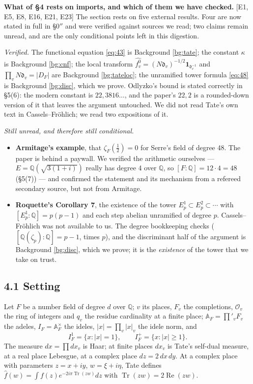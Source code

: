 \documentclass[11pt,reqno]{amsart}
\theoremstyle{plain}
\theoremstyle{definition}
\theoremstyle{remark}
\newcommand{\Q}{\mathbb{Q}}
\newcommand{\fh}{\widehat{f}}
\DeclareMathOperator{\Tr}{Tr}
\newcommand{\Ledger}[1]{{\scriptsize\textsf{[#1]}}}
\begin{document}
\begin{caution}
\textbf{What of \S4 rests on imports, and which of them we have checked.}
\Ledger{E1, E5, E8, E16, E21, E23} The section rests on five external results. Four are
now stated in full in \S0$''$ and were verified against sources we read; two claims
remain unread, and are the only conditional points left in this digestion.

\emph{Verified.} The functional equation \eqref{eq:43} is Background \ref{bg:tate};
the constant $\kappa$ is Background \ref{bg:cnf}; the local transform
$\widehat{f_v^0}=(N\mathfrak d_v)^{-1/2}\mathbf 1_{\mathfrak d_v^{-1}}$ and
$\prod_vN\mathfrak d_v=|D_F|$ are Background \ref{bg:tateloc}; the unramified tower
formula \eqref{eq:48} is Background \ref{bg:disc}, which we prove. Odlyzko's bound is
stated correctly in \S5(6): the modern constant is $22{,}3816\ldots$, and the paper's
$22{,}2$ is a rounded-down version of it that leaves the argument untouched. We did
not read Tate's own text in Cassels--Fr\"ohlich; we read two expositions of it.

\emph{Still unread, and therefore still conditional.}
\begin{itemize}[leftmargin=1.4em,itemsep=2pt]
\item \textbf{Armitage's example}, that $\zeta_F(\tfrac12)=0$ for Serre's field of
  degree 48. The paper is behind a paywall. We verified the arithmetic ourselves ---
  $E=\Q(\sqrt{3(1+i)})$ really has degree 4 over $\Q$, so $[F:\Q]=12\cdot4=48$
  (\S5(7)) --- and confirmed the statement and its mechanism from a refereed secondary
  source, but not from Armitage.
\item \textbf{Roquette's Corollary 7}, the existence of the tower $E_p^1\subset
  E_p^2\subset\cdots$ with $[E_p^1:\Q]=p(p-1)$ and each step abelian unramified of
  degree $p$. Cassels--Fr\"ohlich was not available to us. The degree bookkeeping
  checks ($[\Q(\zeta_p):\Q]=p-1$, times $p$), and the discriminant half of the argument
  is Background \ref{bg:disc}, which we prove; it is the \emph{existence} of the tower
  that we take on trust.
\end{itemize}
\end{caution}

\subsection*{4.1 Setting}

Let $F$ be a number field of degree $d$ over $\Q$; $v$ its places, $F_v$ the
completions, $\mathcal O_v$ the ring of integers and $q_v$ the residue cardinality at
a finite place; $\mathbb A_F=\prod'_vF_v$ the adeles, $I_F=\mathbb A_F^\times$ the
ideles, $|x|=\prod_v|x|_v$ the idele norm, and
\[I_F^1=\{x:|x|=1\},\qquad I_F^+=\{x:|x|\ge1\} .\]
The measure $dx=\prod dx_v$ is Haar; at finite places $dx_v$ is Tate's self-dual
measure, at a real place Lebesgue, at a complex place $dz=2\,dx\,dy$. At a complex
place with parameters $z=x+iy$, $w=\xi+i\eta$, Tate defines
$\fh(w)=\int f(z)e^{-2i\pi\Tr(zw)}dz$ with $\Tr(zw)=2\operatorname{Re}(zw)$.
\end{document}
